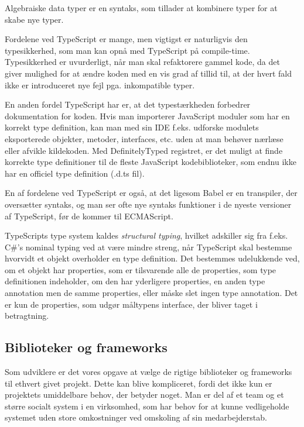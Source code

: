 \documentclass[]{article}
\begin{document}
Algebraiske data typer er en syntaks, som tillader at kombinere typer
for at skabe nye typer.

Fordelene ved TypeScript er mange, men vigtigst er naturligvis den
typesikkerhed, som man kan opnå med TypeScript på compile-time.
Typesikkerhed er uvurderligt, når man skal refaktorere gammel kode, da
det giver mulighed for at ændre koden med en vis grad af tillid til, at
der hvert fald ikke er introduceret nye fejl pga. inkompatible typer.

En anden fordel TypeScript har er, at det typestærkheden forbedrer
dokumentation for koden. Hvis man importerer JavaScript moduler som har
en korrekt type definition, kan man med sin IDE f.eks. udforske modulets
eksporterede objekter, metoder, interfaces, etc. uden at man behøver
nærlæse eller afvikle kildekoden. Med DefinitelyTyped registret, er det
muligt at finde korrekte type definitioner til de fleste JavaScript
kodebiblioteker, som endnu ikke har en officiel type definition (.d.ts
fil).

En af fordelene ved TypeScript er også, at det ligesom Babel er en
transpiler, der oversætter syntaks, og man ser ofte nye syntaks
funktioner i de nyeste versioner af TypeScript, før de kommer til
ECMAScript.

TypeScripts type system kaldes \emph{structural typing}, hvilket
adskiller sig fra f.eks. C\#'s nominal typing ved at være mindre streng,
når TypeScript skal bestemme hvorvidt et objekt overholder en type
definition. Det bestemmes udelukkende ved, om et objekt har properties,
som er tilsvarende alle de properties, som type definitionen indeholder,
om den har yderligere properties, en anden type annotation men de samme
properties, eller måske slet ingen type annotation. Det er kun de
properties, som udgør måltypens interface, der bliver taget i
betragtning.

\hypertarget{biblioteker-og-frameworks}{%
\subsection{Biblioteker og frameworks}\label{biblioteker-og-frameworks}}

Som udviklere er det vores opgave at vælge de rigtige biblioteker og
frameworks til ethvert givet projekt. Dette kan blive kompliceret, fordi
det ikke kun er projektets umiddelbare behov, der betyder noget. Man er
del af et team og et større socialt system i en virksomhed, som har
behov for at kunne vedligeholde systemet uden store omkostninger ved
omskoling af sin medarbejderstab.
\end{document}
